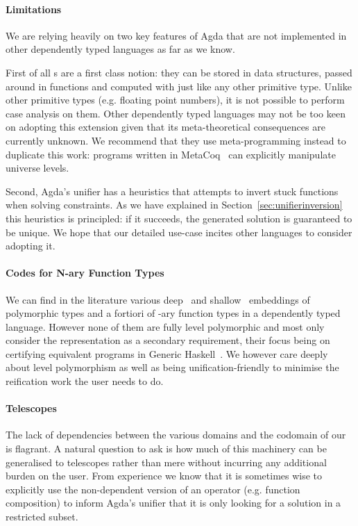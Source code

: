 {\paragraph{Limitations} We are relying heavily on two key features of Agda
that are not implemented in other dependently typed languages as far as we know.

First of all s are a first class notion: they can be stored in
data structures, passed around in functions and computed with just like
any other primitive type. Unlike other primitive types (e.g. floating point
numbers), it is not possible to perform case analysis on them. Other
dependently typed languages may not be too keen on adopting this extension
given that its meta-theoretical consequences are currently unknown. We
recommend that they use meta-programming instead to duplicate this work:
programs written in MetaCoq~\cite{DBLP:conf/itp/AnandBCST18,draf/metacoq18}
can explicitly manipulate universe levels.

Second, Agda's unifier has a heuristics that attempts to invert stuck functions
when solving constraints. As we have explained in Section~\ref{sec:unifierinversion}
this heuristics is principled: if it succeeds, the generated solution is
guaranteed to be unique. We hope that our detailed use-case incites other
languages to consider adopting it.

\paragraph{Codes for N-ary Function Types} We can find in the literature various
deep~\cite{DBLP:conf/icfp/VerbruggenVH08} and
shallow~\cite{DBLP:journals/jfp/McBride02,DBLP:conf/plpv/WeirichC10}
embeddings of polymorphic types and a fortiori of -ary function types in
a dependently typed language. However none of them are fully level polymorphic
and most only consider the representation as a secondary requirement, their
focus being on certifying equivalent programs in Generic Haskell~\cite{DBLP:conf/popl/Hinze00}.
We however care deeply about level polymorphism as well as being unification-friendly
to minimise the reification work the user needs to do.

\paragraph{Telescopes} The lack of dependencies between the various domains
and the codomain of our  is flagrant. A natural question to ask
is how much of this machinery can be generalised to telescopes rather than
mere  without incurring any additional burden on the user. From
experience we know that it is sometimes wise to explicitly use the
non-dependent version of an operator (e.g. function composition) to inform
Agda's unifier that it is only looking for a solution in a restricted
subset.

}
